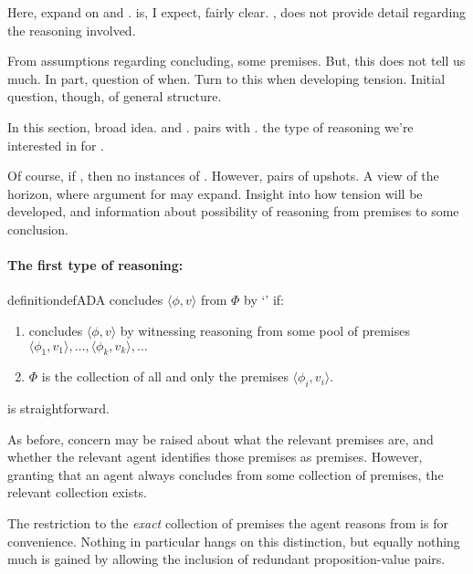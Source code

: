 \begin{note}
  Here, expand on \ESU{} and \EAS{}.
  \ESU{} is, I expect, fairly clear.
  \EAS{}, does not provide detail regarding the reasoning involved.

  From assumptions regarding concluding, some premises.
  But, this does not tell us much.
  In part, question of when.
  Turn to this when developing tension.
  Initial question, though, of general structure.

  In this section, broad idea.
  \adA{} and \adB{}.
  \adA{} pairs with \USE{}.
  \adB{} the type of reasoning we're interested in for \EAS{}.

  Of course, if \ESU{}, then no instances of \adB{}.
  However, pairs of upshots.
  A view of the horizon, where argument for \EAS{} may expand.
  Insight into how tension will be developed, \csN{} and information about possibility of reasoning from premises to some conclusion.
\end{note}

\paragraph*{The first type of reasoning: \adA{}}

\begin{note}
  \begin{restatable}[\adA{}]{definition}{defADA}
    \label{AR:adA}
    \label{def:adA}
    \vAgent{} concludes \(\langle \phi,v \rangle\) from \(\Phi\) by `\adA{}' if:
    \begin{enumerate}[label=\textsf{S:\arabic*}., ref=(\textsf{S}:\arabic*)]
    \item
      \label{def:adA:psi}
      \vAgent{} concludes \(\langle \phi,v \rangle\) by witnessing reasoning from some pool of premises \(\langle \phi_{1},v_{1} \rangle, \dots, \langle \phi_{k},v_{k} \rangle, \dots\)
    \item
      \(\Phi\) is the collection of all and only the premises \(\langle \phi_{i},v_{i} \rangle\).
    \end{enumerate}
    \vspace{-\baselineskip}
  \end{restatable}

  \adA{} is straightforward.

  As before, concern may be raised about what the relevant premises are, and whether the relevant agent identifies those premises as premises.
  However, granting that an agent always concludes from some collection of premises, the relevant collection exists.

  The restriction to the \emph{exact} collection of premises the agent reasons from is for convenience.
  Nothing in particular hangs on this distinction, but equally nothing much is gained by allowing the inclusion of redundant proposition-value pairs.
\end{note}

